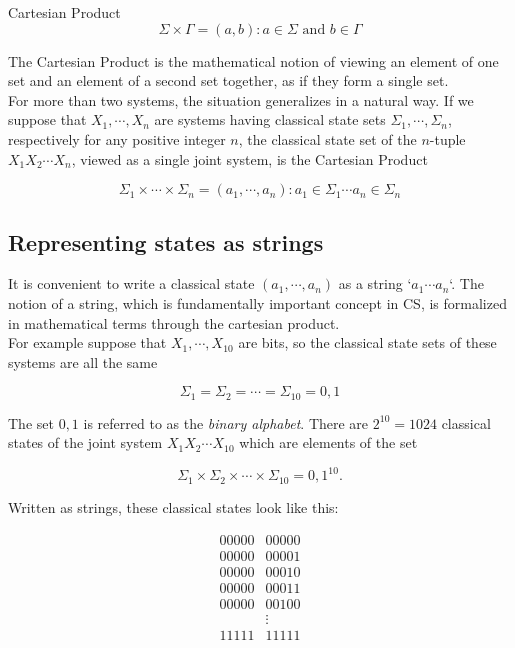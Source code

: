 \documentclass[svgnames]{article}     %
\begin{document}
\begin{mainbox}{Cartesian Product}
\[
  \Sigma \times \Gamma = { (a, b) : a \in \Sigma \text{ and } b \in \Gamma}
\] 
\end{mainbox}

The Cartesian Product is the mathematical notion of viewing an element of one set and an element of a second set together, as if they form a single set. \\ 

For more than two systems, the situation generalizes in a natural way. If we suppose that $X_1, \cdots, X_n$ are systems having classical state sets $\Sigma_1, \cdots, \Sigma_n$, respectively for any positive integer $n$, the classical state set of the $n$-tuple $X_1X_2\cdots X_n$, viewed as a single joint system, is the Cartesian Product

\[
  \Sigma_1 \times \cdots \times \Sigma_n = {(a_1, \cdots, a_n) : a_1 \in \Sigma_1 \cdots a_n \in \Sigma_n}
\] \vspace{5px}

\subsection{Representing states as strings} 

It is convenient to write a classical state $(a_1, \cdots, a_n)$ as a string `$a_1 \cdots a_n$`. The notion of a string, which is fundamentally important concept in CS, is formalized in mathematical terms through the cartesian product. \\

For example suppose that $X_1, \cdots , X_{10}$ are bits, so the classical state sets of these systems are all the same 

\[
  \Sigma_1 = \Sigma_2 = \cdots = \Sigma_{10} = {0, 1}
\] \vspace{5px}

The set ${0, 1}$ is referred to as the \textit{binary alphabet}. There are
$2^{10} = 1024$ classical states of the joint system $X_1X_2 \cdots X_{10}$
which are elements of the set

\[
  \Sigma_1 \times \Sigma_2 \times \cdots \times \Sigma_{10} = {0, 1}^10. 
\] \vspace{5px}

Written as strings, these classical states look like this: 

\begin{align*}
  00000&00000 \\
  00000&00001 \\
  00000&00010 \\
  00000&00011 \\
  00000&00100 \\
       &\vdots \\
  11111&11111
\end{align*}
\end{document}
